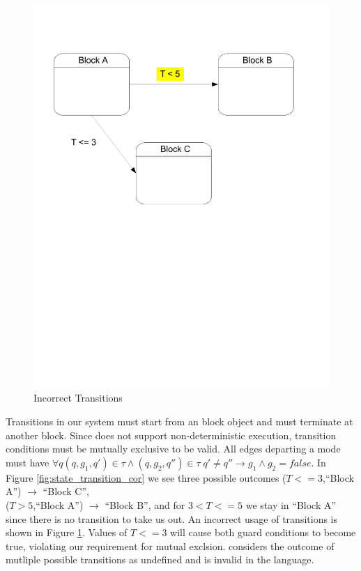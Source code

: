 \begin{figure}[htp]
    \centering
    \includegraphics[trim= 10mm 130mm 20mm 10mm, clip, width=\imgmedphoto]{./images/state_transition_bad.pdf}
    \caption{Incorrect Transitions}
    \label{fig:state_transition_bad}
\end{figure}

Transitions in our system must start from an block object and must terminate at another block. Since \emphasize{\plcchart} does not support non-deterministic execution, transition conditions must be mutually exclusive to be valid. All edges departing a mode must have ${\forall q} {(q,g_1,q') \in \tau} \wedge {(q,g_2,q'') \in \tau} \; {q' \neq q'' \rightarrow g_1 \wedge g_2 = false}$. In Figure \ref{fig:state_transition_cor} we see three possible outcomes ($T<=3$,``Block A'') $\rightarrow$ ``Block C'',  \\
($T>5$,``Block A'') $\rightarrow$ ``Block B'', and for $3 < T <= 5$ we stay in ``Block A'' since there is no transition to take us out. An incorrect usage of transitions is shown in Figure \ref{fig:state_transition_bad}. Values of $T <= 3$ will cause both guard conditions to become true, violating our requirement for mutual exclsion. \emphasize{\plcchart} considers the outcome of mutliple possible transitions as undefined and is invalid in the language.
